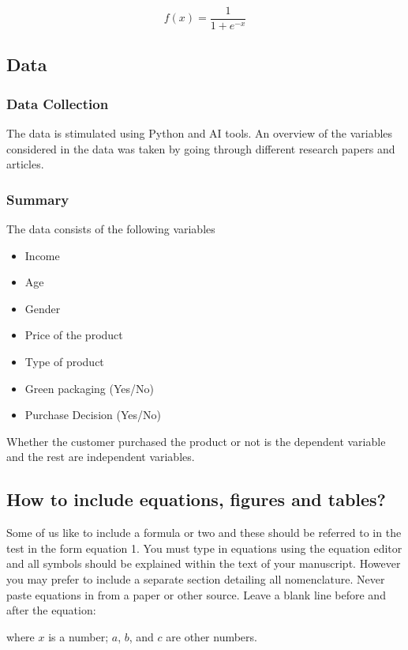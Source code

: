 \documentclass[a4paper,10pt]{article}
\begin{document}
\begin{equation}
f(x) = \frac{1}{1 + e^{-x}}
\label{sigmoid_eq}
\end{equation}

\subsection{Data}
\subsubsection{Data Collection}

The data is stimulated using Python and AI tools. An overview of the variables considered in the data was taken by going through different research papers and articles. 

\subsubsection{Summary}
The data consists of the following variables
\begin{itemize}

    \item Income 
    \item Age 
    \item Gender 
    \item Price of the product
    \item Type of product
    \item Green packaging (Yes/No)
    \item Purchase Decision (Yes/No)
\end{itemize}

Whether the customer purchased the product or not is the dependent variable and the rest are independent variables. 

\subsection{How to include equations, figures and tables?}

Some of us like to include a formula or two and these should be referred to in the test in the form equation 1. You must type in equations using the equation editor and all symbols should be explained within the text of your manuscript. However you may prefer to include a separate section detailing all nomenclature. Never paste equations in from a paper or other source. Leave a blank line before and after the equation:


where $x$ is a number; $a$, $b$, and $c$ are other numbers.
\end{document}
